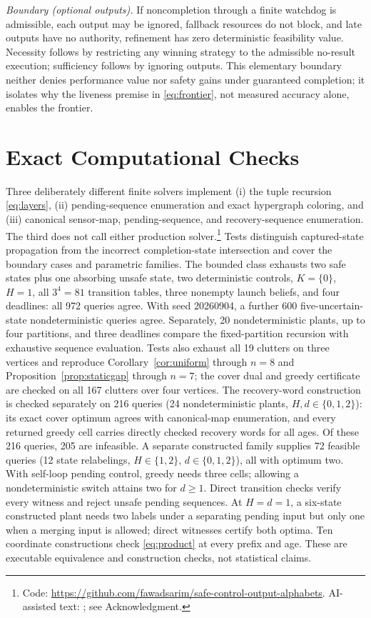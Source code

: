 \documentclass[letterpaper,10pt,conference]{ieeeconf}
\begin{document}
\noindent\textit{Boundary (optional outputs).}
If noncompletion through a finite watchdog is admissible, each output may be ignored, fallback
resources do not block, and late outputs have no authority, refinement has zero deterministic
feasibility value. Necessity follows by restricting any winning strategy to the admissible
no-result execution; sufficiency follows by ignoring outputs. This elementary boundary neither
denies performance value nor safety gains under guaranteed completion; it isolates why the
liveness premise in \eqref{eq:frontier}, not measured accuracy alone, enables the frontier.

\section{Exact Computational Checks}

Three deliberately different finite solvers implement (i) the tuple recursion \eqref{eq:layers},
(ii) pending-sequence enumeration and exact hypergraph coloring, and (iii) canonical sensor-map,
pending-sequence, and recovery-sequence enumeration. The third does not call either production
solver.\footnote{Code: \url{https://github.com/fawadsarim/safe-control-output-alphabets}.
AI-assisted text: \cite{openai2026codex}; see Acknowledgment.}
Tests distinguish captured-state propagation from the incorrect completion-state
intersection and cover the boundary cases and parametric families. The bounded class exhausts two
safe states plus one absorbing unsafe state, two deterministic controls, $K=\{0\}$, $H=1$, all
$3^4=81$ transition tables, three nonempty launch beliefs, and four deadlines: all 972 queries
agree. With seed 20260904, a further 600 five-uncertain-state nondeterministic queries agree.
Separately, 20 nondeterministic plants, up to four partitions, and three deadlines compare the
fixed-partition recursion with exhaustive sequence evaluation. Tests also exhaust all 19 clutters
on three vertices and reproduce Corollary~\ref{cor:uniform} through $n=8$ and
Proposition~\ref{prop:staticgap} through $n=7$; the cover dual and greedy certificate are checked
on all 167 clutters over four vertices. The recovery-word construction is checked separately on
216 queries (24 nondeterministic plants, $H,d\in\{0,1,2\}$): its exact cover optimum agrees with
canonical-map enumeration, and every returned greedy cell carries directly checked recovery words
for all ages. Of these 216 queries, 205 are infeasible. A separate constructed family supplies
72 feasible queries (12 state relabelings, $H\in\{1,2\}$, $d\in\{0,1,2\}$), all with optimum two.
With self-loop pending control, greedy needs three cells; allowing a nondeterministic switch
attains two for $d\ge1$. Direct transition checks verify every witness and reject unsafe pending
sequences. At $H=d=1$, a six-state constructed plant needs two labels under a separating pending
input but only one when a merging input is allowed; direct witnesses certify both optima.
Ten coordinate constructions check \eqref{eq:product} at every prefix and age.
These are executable equivalence and construction checks, not statistical claims.
\end{document}
